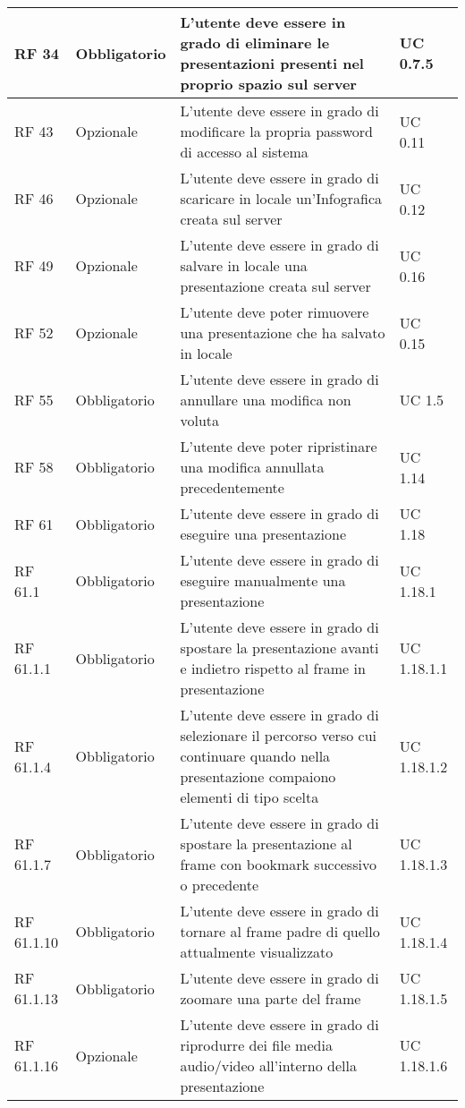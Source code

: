 {\begin{longtable} [c]{| p{2.5cm} | p{2.5cm} | p{6cm} |p{2.5cm}|}
 \hline 
RF 34 & Obbligatorio & L’utente deve essere in grado di eliminare le presentazioni presenti nel proprio spazio sul server & UC 0.7.5\\ 
 \hline 
RF 43 & Opzionale & L’utente deve essere in grado di modificare la propria password di accesso al sistema & UC 0.11\\ 
 \hline 
RF 46 & Opzionale & L’utente deve essere in grado di scaricare in locale un’Infografica creata sul server & UC 0.12\\ 
 \hline 
RF 49 & Opzionale & L’utente deve essere in grado di salvare in locale una presentazione creata sul server & UC 0.16\\ 
 \hline 
RF 52 & Opzionale & L’utente deve poter rimuovere una presentazione che ha salvato in locale & UC 0.15\\ 
 \hline 
RF 55 & Obbligatorio & L'utente deve essere in grado di annullare una modifica non voluta & UC 1.5\\ 
 \hline 
RF 58 & Obbligatorio & L'utente deve poter ripristinare una modifica annullata precedentemente & UC 1.14\\ 
 \hline 
RF 61 & Obbligatorio & L'utente deve essere in grado di eseguire una presentazione & UC 1.18\\ 
 \hline 
RF 61.1 & Obbligatorio & L'utente deve essere in grado di eseguire manualmente una presentazione & UC 1.18.1\\ 
 \hline 
RF 61.1.1 & Obbligatorio & L'utente deve essere in grado di spostare la presentazione avanti e indietro rispetto al frame in presentazione & UC 1.18.1.1\\ 
 \hline 
RF 61.1.4 & Obbligatorio & L'utente deve essere in grado di selezionare il percorso verso cui continuare quando nella presentazione compaiono elementi di tipo scelta & UC 1.18.1.2\\ 
 \hline 
RF 61.1.7 & Obbligatorio & L'utente deve essere in grado di spostare la presentazione al frame con bookmark successivo o precedente & UC 1.18.1.3\\ 
 \hline 
RF 61.1.10 & Obbligatorio & L'utente deve essere in grado di tornare al frame padre di quello attualmente visualizzato & UC 1.18.1.4\\ 
 \hline 
RF 61.1.13 & Obbligatorio & L'utente deve essere in grado di zoomare una parte del frame & UC 1.18.1.5\\ 
 \hline 
RF 61.1.16 & Opzionale & L'utente deve essere in grado di riprodurre dei file media audio/video all'interno della presentazione & UC 1.18.1.6\\ 

\end{longtable}}
